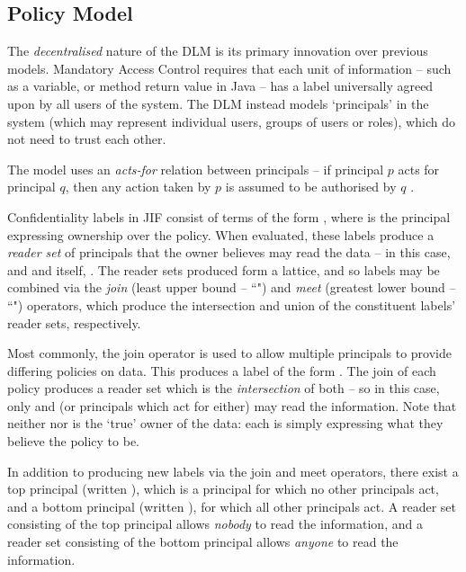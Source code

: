 \subsection{Policy Model}

The \textit{decentralised} nature of the DLM is its primary innovation over previous models. Mandatory Access Control requires that each unit of information -- such as a variable, or method return value in Java -- has a label universally agreed upon by all users of the system. The DLM instead models `principals' in the system (which may represent individual users, groups of users or roles), which do not need to trust each other.

The model uses an \textit{acts-for} relation between principals -- if principal $ p $ acts for principal $ q $, then any action taken by $ p $ is assumed to be authorised by $ q $ \cite{myers2000dlm}.

Confidentiality labels in JIF consist of terms of the form , where  is the principal expressing ownership over the policy. When evaluated, these labels produce a \textit{reader set} of principals that the owner believes may read the data -- in this case,  and  and itself, . The reader sets produced form a lattice, and so labels may be combined via the \textit{join} (least upper bound -- ``\mono{;}") and \textit{meet} (greatest lower bound -- ``") operators, which produce the intersection and union of the constituent labels' reader sets, respectively.

Most commonly, the join operator is used to allow multiple principals to provide differing policies on data. This produces a label of the form . The join of each policy produces a reader set which is the \textit{intersection} of both -- so in this case, only  and  (or principals which act for either) may read the information. Note that neither  nor  is the `true' owner of the data: each is simply expressing what they believe the policy to be.

In addition to producing new labels via the join and meet operators, there exist a top principal (written \mono{*}), which is a principal for which no other principals act, and a bottom principal (written \mono{\_}), for which all other principals act. A reader set consisting of the top principal allows \textit{nobody} to read the information, and a reader set consisting of the bottom principal allows \textit{anyone} to read the information.

